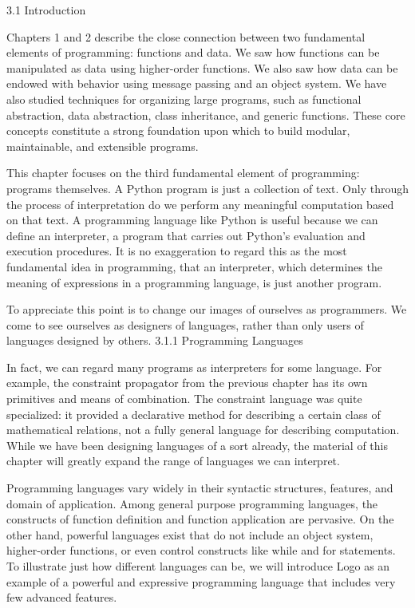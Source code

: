 \documentclass[letterpaper,10pt,dvipdfmx]{sphinxmanual}
\begin{document}
3.1   Introduction

Chapters 1 and 2 describe the close connection between two fundamental elements of programming: functions and data. We saw how functions can be manipulated as data using higher-order functions. We also saw how data can be endowed with behavior using message passing and an object system. We have also studied techniques for organizing large programs, such as functional abstraction, data abstraction, class inheritance, and generic functions. These core concepts constitute a strong foundation upon which to build modular, maintainable, and extensible programs.

This chapter focuses on the third fundamental element of programming: programs themselves. A Python program is just a collection of text. Only through the process of interpretation do we perform any meaningful computation based on that text. A programming language like Python is useful because we can define an interpreter, a program that carries out Python's evaluation and execution procedures. It is no exaggeration to regard this as the most fundamental idea in programming, that an interpreter, which determines the meaning of expressions in a programming language, is just another program.

To appreciate this point is to change our images of ourselves as programmers. We come to see ourselves as designers of languages, rather than only users of languages designed by others.
3.1.1   Programming Languages

In fact, we can regard many programs as interpreters for some language. For example, the constraint propagator from the previous chapter has its own primitives and means of combination. The constraint language was quite specialized: it provided a declarative method for describing a certain class of mathematical relations, not a fully general language for describing computation. While we have been designing languages of a sort already, the material of this chapter will greatly expand the range of languages we can interpret.

Programming languages vary widely in their syntactic structures, features, and domain of application. Among general purpose programming languages, the constructs of function definition and function application are pervasive. On the other hand, powerful languages exist that do not include an object system, higher-order functions, or even control constructs like while and for statements. To illustrate just how different languages can be, we will introduce Logo as an example of a powerful and expressive programming language that includes very few advanced features.
\end{document}

